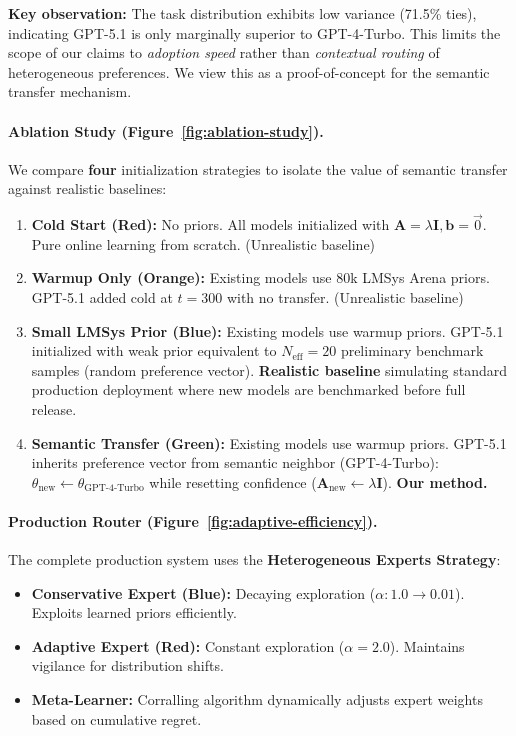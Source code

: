 \noindent\textbf{Key observation:} The task distribution exhibits low variance (71.5\% ties), indicating GPT-5.1 is only marginally superior to GPT-4-Turbo. This limits the scope of our claims to \textit{adoption speed} rather than \textit{contextual routing} of heterogeneous preferences. We view this as a proof-of-concept for the semantic transfer mechanism.

\paragraph{Ablation Study (Figure~\ref{fig:ablation-study}).} 
We compare \textbf{four} initialization strategies to isolate the value of semantic transfer against realistic baselines:

\begin{enumerate}
    \item \textbf{Cold Start (Red):} No priors. All models initialized with $\mathbf{A}=\lambda \mathbf{I}, \mathbf{b}=\vec{0}$. Pure online learning from scratch. (Unrealistic baseline)
    
    \item \textbf{Warmup Only (Orange):} Existing models use 80k LMSys Arena priors. GPT-5.1 added cold at $t=300$ with no transfer. (Unrealistic baseline)
    
    \item \textbf{Small LMSys Prior (Blue):} Existing models use warmup priors. GPT-5.1 initialized with weak prior equivalent to $N_{\text{eff}}=20$ preliminary benchmark samples (random preference vector). \textbf{Realistic baseline} simulating standard production deployment where new models are benchmarked before full release.
    
    \item \textbf{Semantic Transfer (Green):} Existing models use warmup priors. GPT-5.1 inherits preference vector from semantic neighbor (GPT-4-Turbo): $\theta_{\text{new}} \leftarrow \theta_{\text{GPT-4-Turbo}}$ while resetting confidence ($\mathbf{A}_{\text{new}} \leftarrow \lambda \mathbf{I}$). \textbf{Our method.}
\end{enumerate}

\paragraph{Production Router (Figure~\ref{fig:adaptive-efficiency}).}
The complete production system uses the \textbf{Heterogeneous Experts Strategy}:

\begin{itemize}
    \item \textbf{Conservative Expert (Blue):} Decaying exploration ($\alpha: 1.0 \to 0.01$). Exploits learned priors efficiently.
    
    \item \textbf{Adaptive Expert (Red):} Constant exploration ($\alpha = 2.0$). Maintains vigilance for distribution shifts.
    
    \item \textbf{Meta-Learner:} Corralling algorithm dynamically adjusts expert weights based on cumulative regret.
\end{itemize}

